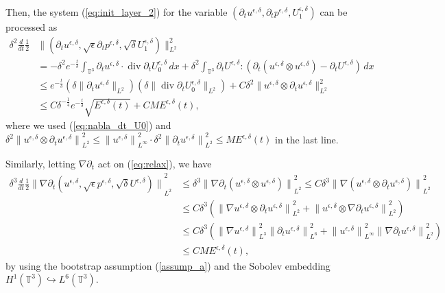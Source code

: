 \documentclass[reqno,10pt]{amsart}
\theoremstyle{definition}
\theoremstyle{remark}
\numberwithin{equation}{section}
\DeclareMathOperator{\dive}{div}
\begin{document}
Then, the system (\ref{eq:init_layer_2}) for the variable $(\partial_t u^{\epsilon,\delta},  \partial_t p^{\epsilon,\delta}, U^{\epsilon,\delta}_1)$ can be processed as
\[
\begin{aligned}
    \delta^2 \frac{d}{dt} \frac{1}{2} &\| ( \partial_tu^{\epsilon,\delta}, \sqrt\epsilon \partial_tp^{\epsilon,\delta}, \sqrt\delta U_1^{\epsilon,\delta})\|_{L^2}^2 \\
    &= - \delta^2 e^{-\frac{t}{\delta}} \int_{\mathbb T^3} \partial_tu^{\epsilon,\delta} \cdot \dive \partial_t U^{\epsilon,\delta}_0 \,dx  + \delta^2\int_{\mathbb T^3} \partial_t U^{\epsilon,\delta}: \left(  \partial_t (u^{\epsilon,\delta}\otimes u^{\epsilon,\delta}) - \partial_t U^{\epsilon,\delta} \right)  \, dx \\
    &\le e^{-\frac{t}{\delta}} \left(\delta\|\partial_t u^{\epsilon,\delta}\|_{L^2}\right) \left(\delta \| \dive \partial_t U^{\epsilon,\delta}_0 \|_{L^2}\right) +  C\delta^2 \| u^{\epsilon,\delta}\otimes \partial_tu^{\epsilon,\delta}\|_{L^2}^2 \\
    &\le C \delta^{-\frac{1}{4}}e^{-\frac{t}{\delta}} \sqrt{E^{\epsilon,\delta}(t)} + CME^{\epsilon,\delta}(t),
\end{aligned}
\]
where we used (\ref{eq:nabla_dt_U0}) and $\delta^2 {\| u^{\epsilon,\delta}\otimes \partial_t u^{\epsilon,\delta}\|}_{L^2}^2 \le {\| u^{\epsilon,\delta}\|}_{L^\infty}^2 \cdot \delta^2{\| \partial_t u^{\epsilon,\delta}\|}_{L^2}^2 \le ME^{\epsilon,\delta}(t)$ in the last line.


Similarly, letting $\nabla \partial_t$ act on (\ref{eq:relax}), we have
\[
\begin{aligned}
    \delta^3\frac{d}{dt}\frac{1}{2}{\| \nabla\partial_t ( u^{\epsilon,\delta}, \sqrt\epsilon p^{\epsilon,\delta}, \sqrt\delta U^{\epsilon,\delta})\|}_{L^2}^2
    &\le \delta^3{\| \nabla\partial_t (u^{\epsilon,\delta}\otimes u^{\epsilon,\delta})\|}_{L^2}^2 \le C \delta^3 {\| \nabla (u^{\epsilon,\delta}\otimes \partial_tu^{\epsilon,\delta})\|}_{L^2}^2 \\
    &\le C\delta^3 \left({\|\nabla u^{\epsilon,\delta} \otimes \partial_t u^{\epsilon,\delta}\|}_{L^2}^2 +{ \| u^{\epsilon,\delta} \otimes \nabla \partial_t u^{\epsilon,\delta}\|}_{L^2}^2 \right) \\
    &\le C\delta^3 \left( {\|\nabla u^{\epsilon,\delta}\|}_{L^3}^2 {\| \partial_t u^{\epsilon,\delta}\|}_{L^6}^2 +  {\| u^{\epsilon,\delta}\|}_{L^\infty}^2{\| \nabla\partial_t u^{\epsilon,\delta}\|}_{L^2}^2 \right) \\
    &\le CME^{\epsilon,\delta}(t),
\end{aligned}
\]
by using the bootstrap assumption (\ref{assump_a}) and the Sobolev embedding $H^1(\mathbb T^3)\hookrightarrow L^6(\mathbb T^3)$.
\end{document}
